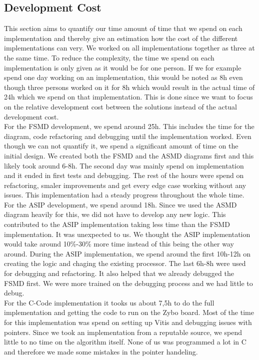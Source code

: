 \documentclass[conference]{IEEEtran}
\begin{document}
\subsection{Development Cost}
This section aims to quantify our time amount of time that we spend on each implementation and thereby give an estimation how the cost of the different implementations can very. We worked on all implementations together as three at the same time. To reduce the complexity, the time we spend on each implementation is only given as it would be for one person. If we for example spend one day working on an implementation, this would be noted as 8h even though three persons worked on it for 8h which would result in the actual time of 24h which we spend on that implementation. This is done since we want to focus on the relative development cost between the solutions instead of the actual development cost.\\
For the FSMD development, we spend around 25h. This includes the time for the diagram, code refactoring and debugging until the implementation worked. Even though we can not quantify it, we spend a significant amount of time on the initial design. We created both the FSMD and the ASMD diagrams first and this likely took around 6-8h. The second day was mainly spend on implementation and it ended in first tests and debugging. The rest of the hours were spend on refactoring, smaler improvements and get every edge case working without any issues. This implementation had a steady progress throughout the whole time.\\
For the ASIP development, we spend around 18h. Since we used the ASMD diagram heavily for this, we did not have to develop any new logic. This contributed to the ASIP implementation taking less time than the FSMD implementation. It was unexpected to us. We thought the ASIP implementation would take around 10\%-30\% more time instead of this being the other way around. During the ASIP implementation, we spend around the first 10h-12h on creating the logic and chaging the existing processor. The last 6h-8h were used for debugging and refactoring. It also helped that we already debugged the FSMD first. We were more trained on the debugging process and we had little to debug. \\
For the C-Code implementation it tooks us about 7,5h to do the full implementation and getting the code to run on the Zybo board. Most of the time for this implementation was spend on setting up Vitis and debugging issues with pointers. Since we took an implementation from a reputable source, we spend little to no time on the algorithm itself. None of us was programmed a lot in C and therefore we made some mistakes in the pointer handeling.\\
\end{document}
